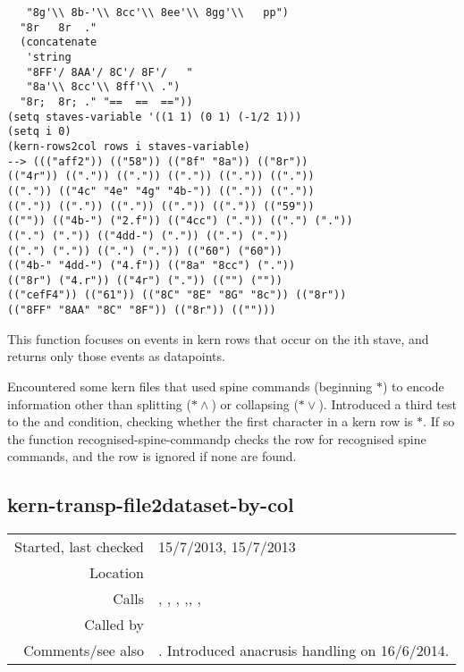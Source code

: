 \begin{verbatim}
   "8g'\\ 8b-'\\ 8cc'\\ 8ee'\\ 8gg'\\	pp")
  "8r	8r	."
  (concatenate
   'string
   "8FF'/ 8AA'/ 8C'/ 8F'/	"
   "8a'\\ 8cc'\\ 8ff'\\	.")
  "8r;	8r;	." "==	==	=="))
(setq staves-variable '((1 1) (0 1) (-1/2 1)))
(setq i 0)
(kern-rows2col rows i staves-variable)
--> ((("aff2")) (("58")) (("8f" "8a")) (("8r"))
(("4r")) ((".")) ((".")) ((".")) ((".")) (("."))
((".")) (("4c" "4e" "4g" "4b-")) ((".")) (("."))
((".")) ((".")) ((".")) ((".")) ((".")) (("59"))
(("")) (("4b-") ("2.f")) (("4cc") (".")) ((".") ("."))
((".") (".")) (("4dd-") (".")) ((".") ("."))
((".") (".")) ((".") (".")) (("60") ("60"))
(("4b-" "4dd-") ("4.f")) (("8a" "8cc") ("."))
(("8r") ("4.r")) (("4r") (".")) (("") (""))
(("cefF4")) (("61")) (("8C" "8E" "8G" "8c")) (("8r"))
(("8FF" "8AA" "8C" "8F")) (("8r")) (("")))
\end{verbatim}

\noindent This function focuses on events in kern
rows that occur on the ith stave, and returns only
those events as datapoints.

Encountered some kern files that used spine commands
(beginning $\ast$) to encode information other than
splitting ($\ast\wedge$) or collapsing ($\ast\vee$).
Introduced a third test to the and condition, checking
whether the first character in a kern row is $\ast$.
If so the function recognised-spine-commandp checks
the row for recognised spine commands, and the row is
ignored if none are found.


\subsection*{kern-transp-file2dataset-by-col}\label{fun:kern-transp-file2dataset-by-col}

\vspace{0.3cm}
\begin{tabular}{r|p{8cm}}
Started, last checked & 15/7/2013, 15/7/2013 \\
Location & \nameref{sec:kern-by-col} \\
Calls & \nameref{fun:header2trans-vec}, \nameref{fun:kern-anacrusis-correction}, \nameref{fun:kern-col2dataset}, \nameref{fun:kern-rows2col},\newline \nameref{fun:read-from-file-arbitrary}, \nameref{fun:sort-dataset-asc},\newline \nameref{fun:staves-info2staves-variable-robust} \\
Called by & \\
Comments/see also & \nameref{fun:kern-file2dataset-by-col}. Intro\-duced \newline anacrusis handling on 16/6/2014.
\end{tabular}

